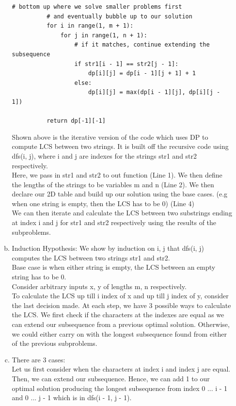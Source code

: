 \documentclass[12pt,letterpaper]{article}
\begin{document}
\begin{enumerate}
\begin{enumerate}[a)]
\begin{lstlisting}[style = Python]
          # bottom up where we solve smaller problems first
          # and eventually bubble up to our solution
          for i in range(1, m + 1):
              for j in range(1, n + 1):
                  # if it matches, continue extending the subsequence
                  if str1[i - 1] == str2[j - 1]:
                      dp[i][j] = dp[i - 1][j + 1] + 1
                  else:
                      dp[i][j] = max(dp[i - 1][j], dp[i][j - 1])
 
          return dp[-1][-1]
  \end{lstlisting}
    Shown above is the iterative version of the code which uses DP to compute LCS between two strings.
    It is built off the recursive code using dfs(i, j), where i and j are indexes for the strings str1 and str2 respectively. \\
    Here, we pass in str1 and str2 to out function (Line 1). 
    We then define the lengths of the strings to be variables m and n (Line 2).
    We then declare our 2D table and build up our solution using the base cases. 
    (e.g when one string is empty, then the LCS has to be 0) (Line 4)\\
    We can then iterate and calculate the LCS between two substrings ending at index i and j for str1 and str2 respectively using the results of the subproblems.
      \item Induction Hypothesis: 
      We show by induction on i, j that dfs(i, j) computes the LCS between two strings str1 and str2. \\
      Base case is when either string is empty, the LCS between an empty string has to be 0. \\
      Consider arbitrary inputs x, y of lengths m, n respectively. \\
      To calculate the LCS up till i index of x and up till j index of y, consider the last decision made.
      At each step, we have 3 possible ways to calculate the LCS.
      We first check if the characters at the indexes are equal as we can extend our subsequence from a previous optimal solution.
      Otherwise, we could either carry on with the longest subsequence found from either of the previous subproblems.
      \item There are 3 cases: \\
        Let us first consider when the characters at index i and index j are equal. Then, we can extend our subsequence.
        Hence, we can add 1 to our optimal solution producing the longest subsequence from index 0 ... i - 1 and 0 ... j - 1 
        which is in dfs(i - 1, j - 1).

\end{enumerate}
\end{enumerate}
\end{document}
